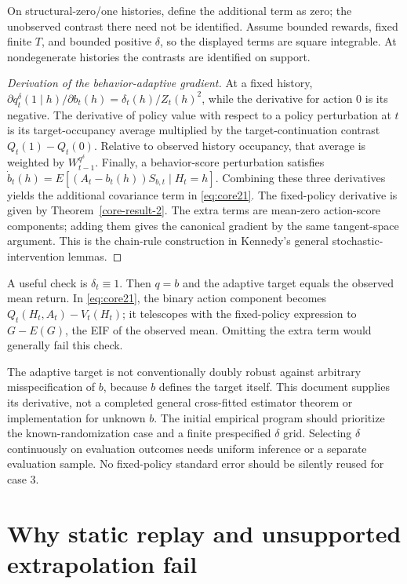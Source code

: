 On structural-zero/one histories, define the additional term as zero; the unobserved contrast there need not be identified. Assume bounded rewards, fixed finite \(T\), and bounded positive \(\delta\), so the displayed terms are square integrable. At nondegenerate histories the contrasts are identified on support.

\begin{proof}[Derivation of the behavior-adaptive gradient] At a fixed history, \(\partial q_t^{\delta}(1\mid h)/\partial b_t(h)=\delta_t(h)/Z_t(h)^2\), while the derivative for action 0 is its negative. The derivative of policy value with respect to a policy perturbation at \(t\) is its target-occupancy average multiplied by the target-continuation contrast \(Q_t(1)-Q_t(0)\). Relative to observed history occupancy, that average is weighted by \(W_{t-1}^{q^{\delta}}\). Finally, a behavior-score perturbation satisfies \(\dot b_t(h)=E[(A_t-b_t(h))S_{b,t}\mid H_t=h]\). Combining these three derivatives yields the additional covariance term in \eqref{eq:core21}. The fixed-policy derivative is given by Theorem~\ref{core-result-2}. The extra terms are mean-zero action-score components; adding them gives the canonical gradient by the same tangent-space argument. This is the chain-rule construction in Kennedy's general stochastic-intervention lemmas. \end{proof}

A useful check is \(\delta_t\equiv1\). Then \(q=b\) and the adaptive target equals the observed mean return. In \eqref{eq:core21}, the binary action component becomes \(Q_t(H_t,A_t)-V_t(H_t)\); it telescopes with the fixed-policy expression to \(G-E(G)\), the EIF of the observed mean. Omitting the extra term would generally fail this check.

The adaptive target is not conventionally doubly robust against arbitrary misspecification of \(b\), because \(b\) defines the target itself. This document supplies its derivative, not a completed general cross-fitted estimator theorem or implementation for unknown \(b\). The initial empirical program should prioritize the known-randomization case and a finite prespecified \(\delta\) grid. Selecting \(\delta\) continuously on evaluation outcomes needs uniform inference or a separate evaluation sample. No fixed-policy standard error should be silently reused for case 3.

\section{Why static replay and unsupported extrapolation fail}\label{why-static-replay-and-unsupported-extrapolation-fail}

